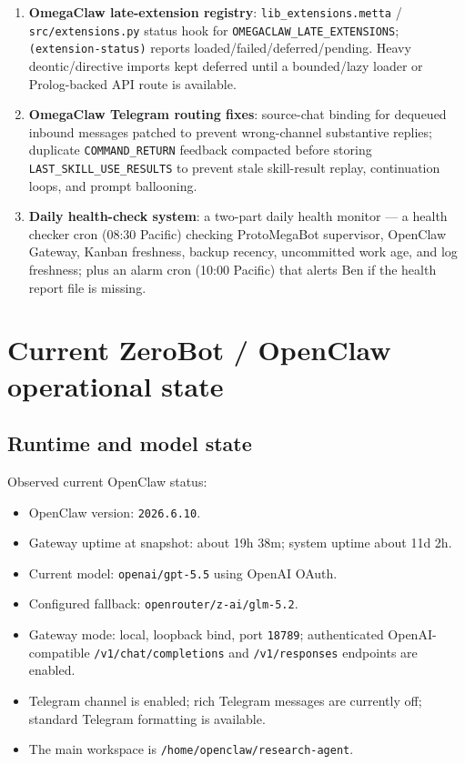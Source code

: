 \documentclass[11pt]{article}
\begin{document}
\begin{enumerate}[label=\arabic*.]
\item \textbf{OmegaClaw late-extension registry}: \texttt{lib\_extensions.metta} / \texttt{src/extensions.py} status hook for \texttt{OMEGACLAW\_LATE\_EXTENSIONS}; \texttt{(extension-status)} reports loaded/failed/deferred/pending. Heavy deontic/directive imports kept deferred until a bounded/lazy loader or Prolog-backed API route is available.
\item \textbf{OmegaClaw Telegram routing fixes}: source-chat binding for dequeued inbound messages patched to prevent wrong-channel substantive replies; duplicate \texttt{COMMAND\_RETURN} feedback compacted before storing \texttt{LAST\_SKILL\_USE\_RESULTS} to prevent stale skill-result replay, continuation loops, and prompt ballooning.
\item \textbf{Daily health-check system}: a two-part daily health monitor --- a health checker cron (08:30 Pacific) checking ProtoMegaBot supervisor, OpenClaw Gateway, Kanban freshness, backup recency, uncommitted work age, and log freshness; plus an alarm cron (10:00 Pacific) that alerts Ben if the health report file is missing.
\end{enumerate}

\section{Current ZeroBot / OpenClaw operational state}

\subsection{Runtime and model state}

Observed current OpenClaw status:
\begin{itemize}
  \item OpenClaw version: \texttt{2026.6.10}.
  \item Gateway uptime at snapshot: about 19h 38m; system uptime about 11d 2h.
  \item Current model: \texttt{openai/gpt-5.5} using OpenAI OAuth.
  \item Configured fallback: \texttt{openrouter/z-ai/glm-5.2}.
  \item Gateway mode: local, loopback bind, port \texttt{18789}; authenticated OpenAI-compatible \texttt{/v1/chat/completions} and \texttt{/v1/responses} endpoints are enabled.
  \item Telegram channel is enabled; rich Telegram messages are currently off; standard Telegram formatting is available.
  \item The main workspace is \texttt{/home/openclaw/research-agent}.
\end{itemize}
\end{document}
